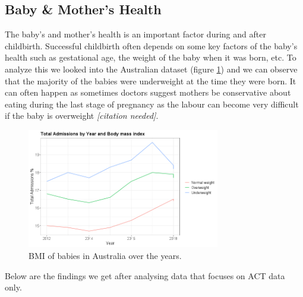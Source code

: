 \subsection{Baby \& Mother's Health}
The baby's and mother's health is an important factor during and after childbirth. Successful childbirth often depends on some key factors of the baby's health such as gestational age, the weight of the baby when it was born, etc. To analyze this we looked into the Australian dataset (figure \ref{fig:bmi_au}) and we can observe that the majority of the babies were underweight at the time they were born. It can often happen as sometimes doctors suggest mothers be conservative about eating during the last stage of pregnancy as the labour can become very difficult if the baby is overweight \emph{[citation needed]}.
\begin{figure}
  \centering
  \includegraphics[width=0.75\textwidth]{subsections/baby_health/bmi.png}
  \caption{BMI of babies in Australia over the years.}
  \label{fig:bmi_au}
\end{figure}
Below are the findings we get after analysing data that focuses on ACT data only.



